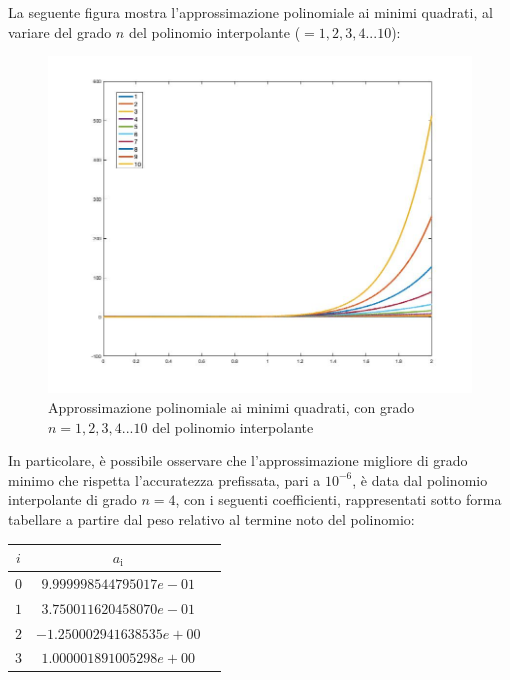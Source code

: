La seguente figura mostra l'approssimazione polinomiale ai minimi quadrati, al variare del grado $n$ del polinomio interpolante ($=1,2,3,4...10$):
\begin{figure}[H]
	\includegraphics[width=\textwidth]{Chapter-4/Exercise-21/plot.jpg}
	\caption*{Approssimazione polinomiale ai minimi quadrati, con grado $n=1,2,3,4...10$ del polinomio interpolante}
\end{figure}
In particolare, è possibile osservare che l'approssimazione migliore di grado minimo che rispetta l'accuratezza prefissata, pari a $10^{-6}$, è data dal polinomio interpolante di grado $n = 4$, con i seguenti coefficienti, rappresentati sotto forma tabellare a partire dal peso relativo al termine noto del polinomio:
\begin{table}[H]
	\centering
	\begin{tabular}{|c|c|c|}
		\hline
		$i$ & $a_\mathrm{i}$ \\
		\hline
		$0$ & $9.999998544795017e-01$ \\
		$1$ & $3.750011620458070e-01$ \\
		$2$ & $-1.250002941638535e+00$ \\
		$3$ & $1.000001891005298e+00$ \\
		\hline
	\end{tabular}
\end{table}
